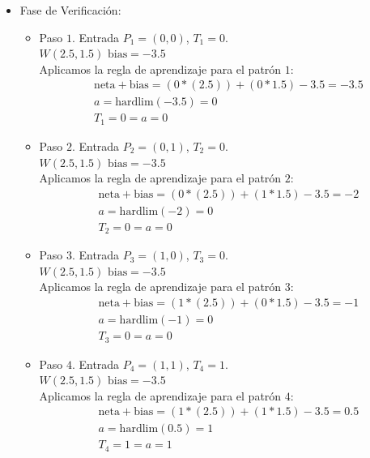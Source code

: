 \documentclass{article}
\begin{document}
{{\begin{itemize}
\item Fase de Verificación:

\begin{itemize}
\item Paso $1$. Entrada $P_1 = (0, 0)$, $T_1 = 0$. \\
$W(2.5, 1.5)$  $\text{bias} = -3.5$ \\

Aplicamos la regla de aprendizaje para el patrón $1$:
\begin{align*}
&\text{neta} + \text{bias}= (0 * (2.5)) + (0 * 1.5) - 3.5 = -3.5\\
&a = \text{hardlim}(-3.5) = 0 \\
&T_1 = 0 = a = 0
\end{align*}


\item Paso $2$. Entrada $P_2 = (0, 1)$, $T_2 = 0$. \\
$W(2.5, 1.5)$  $\text{bias} = -3.5$ \\

Aplicamos la regla de aprendizaje para el patrón $2$:
\begin{align*}
&\text{neta} + \text{bias}= (0 * (2.5)) + (1 * 1.5) - 3.5 = -2\\
&a = \text{hardlim}(-2) = 0 \\
&T_2 = 0 = a = 0
\end{align*}



\item Paso $3$. Entrada $P_3 = ( 1, 0)$, $T_3 = 0$. \\
$W(2.5, 1.5)$  $\text{bias} = -3.5$ \\

Aplicamos la regla de aprendizaje para el patrón $3$:
\begin{align*}
&\text{neta} + \text{bias}= (1 * (2.5)) + (0 * 1.5) - 3.5 = -1\\
&a = \text{hardlim}(-1) = 0 \\
&T_3 = 0 = a = 0
\end{align*}


\item Paso $4$. Entrada $P_4 = (1, 1)$, $T_4 = 1$. \\
$W(2.5, 1.5)$  $\text{bias} = -3.5$ \\

Aplicamos la regla de aprendizaje para el patrón $4$:
\begin{align*}
&\text{neta} + \text{bias}= (1 * (2.5)) + (1 * 1.5) - 3.5 = 0.5\\
&a = \text{hardlim}(0.5) = 1 \\
&T_4 = 1 = a = 1
\end{align*}


\end{itemize}
\end{itemize}}}
\end{document}

